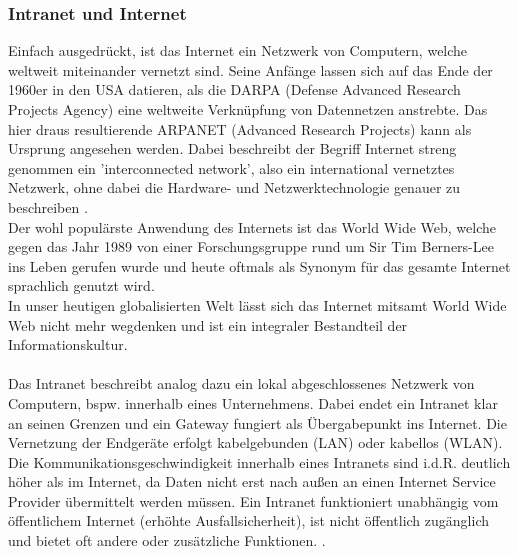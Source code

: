 \subsubsection{Intranet und Internet}\label{sec:intranetundinternet}
Einfach ausgedrückt, ist das Internet ein Netzwerk von Computern, welche weltweit miteinander vernetzt sind. Seine Anfänge lassen sich auf das Ende der 1960er in den USA datieren, als die DARPA (Defense Advanced Research Projects Agency) eine weltweite Verknüpfung von Datennetzen anstrebte. Das hier draus resultierende ARPANET (Advanced Research Projects) kann als Ursprung angesehen werden. Dabei beschreibt der Begriff Internet streng genommen ein 'interconnected network', also ein international vernetztes Netzwerk, ohne dabei die Hardware- und Netzwerktechnologie genauer zu beschreiben \cite{safran2011webtechnologien:article}.  \\ 
Der wohl populärste Anwendung des Internets ist das World Wide Web, welche gegen das Jahr 1989 von einer Forschungsgruppe rund um Sir Tim Berners-Lee ins Leben gerufen wurde und heute oftmals als Synonym für das gesamte Internet sprachlich genutzt wird. \\ 

In unser heutigen globalisierten Welt lässt sich das Internet mitsamt World Wide Web nicht mehr wegdenken und ist ein integraler Bestandteil der Informationskultur. 
 \\ \\
 Das Intranet beschreibt analog dazu ein lokal abgeschlossenes Netzwerk von Computern, bspw. innerhalb eines Unternehmens. Dabei endet ein Intranet klar an seinen Grenzen und ein Gateway fungiert als Übergabepunkt ins Internet. Die Vernetzung der Endgeräte erfolgt kabelgebunden (LAN) oder kabellos (WLAN). Die Kommunikationsgeschwindigkeit innerhalb eines Intranets sind i.d.R. deutlich höher als im Internet, da Daten nicht erst nach außen an einen Internet Service Provider übermittelt werden müssen. Ein Intranet funktioniert unabhängig vom öffentlichem Internet (erhöhte Ausfallsicherheit), ist nicht öffentlich zugänglich und bietet oft andere oder zusätzliche Funktionen. \cite{Intranet62:online}. 
 
